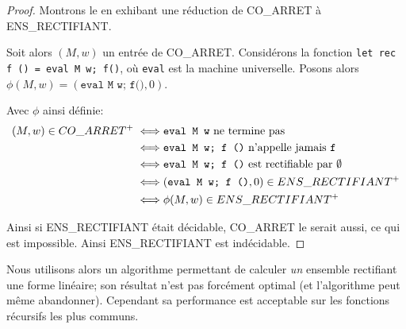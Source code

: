
\begin{proof}
    Montrons le en exhibant une réduction de CO\_ARRET à ENS\_RECTIFIANT.

    Soit alors $(M, w)$ un entrée de CO\_ARRET. Considérons la fonction
    \texttt{let rec f () = eval M w; f()}, o\`u \texttt{eval} est la machine
    universelle. Posons alors $\phi(M, w) = (\texttt{eval M w; f()}, 0)$.

    Avec $\phi$ ainsi définie:
    \begin{align*}
        (M, w) \in CO\_ARRET^+ \iff & \texttt{eval M w} \textnormal{ ne termine pas}                       \\
        \iff                        & \texttt{eval M w; f ()} \textnormal{ n'appelle jamais } \texttt{f}   \\
        \iff                        & \texttt{eval M w; f ()} \textnormal{ est rectifiable par } \emptyset \\
        \iff                        & (\texttt{eval M w; f ()}, 0) \in ENS\_RECTIFIANT^+                   \\
        \iff                        & \phi(M, w) \in ENS\_RECTIFIANT^+
    \end{align*}

    Ainsi si ENS\_RECTIFIANT était décidable, CO\_ARRET le serait aussi, ce qui
    est impossible. Ainsi ENS\_RECTIFIANT est indécidable.
\end{proof}

Nous utilisons alors un algorithme permettant de calculer \textit{un} ensemble
rectifiant une forme linéaire; son résultat n'est pas forcément optimal (et
l'algorithme peut même abandonner). Cependant sa performance est acceptable sur
les fonctions récursifs les plus communs.

